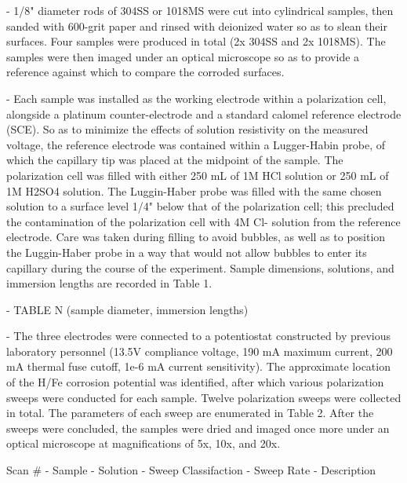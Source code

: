 - 1/8" diameter rods of 304SS or 1018MS were cut into cylindrical samples, then sanded with 600-grit paper and rinsed with deionized water so as to slean their surfaces.  Four samples were produced in total (2x 304SS and 2x 1018MS).  The samples were then imaged under an optical microscope so as to provide a reference against which to compare the corroded surfaces.

- Each sample was installed as the working electrode within a polarization cell, alongside a platinum counter-electrode and a standard calomel reference electrode (SCE).  So as to minimize the effects of solution resistivity on the measured voltage, the reference electrode was contained within a Lugger-Habin probe, of which the capillary tip was placed at the midpoint of the sample.  The polarization cell was filled with either 250 mL of 1M HCl solution or 250 mL of 1M H2SO4 solution.  The Luggin-Haber probe was filled with the same chosen solution to a surface level 1/4" below that of the polarization cell; this precluded the contamination of the polarization cell with 4M Cl- solution from the reference electrode.  Care was taken during filling to avoid bubbles, as well as to position the Luggin-Haber probe in a way that would not allow bubbles to enter its capillary during the course of the experiment.  Sample dimensions, solutions, and immersion lengths are recorded in Table 1.

- TABLE N (sample diameter, immersion lengths)

- The three electrodes were connected to a potentiostat constructed by previous laboratory personnel (13.5V compliance voltage, 190 mA maximum current, 200 mA thermal fuse cutoff, 1e-6 mA current sensitivity).  The approximate location of the H/Fe corrosion potential was identified, after which various polarization sweeps were conducted for each sample.  Twelve polarization sweeps were collected in total.  The parameters of each sweep are enumerated in Table 2.  After the sweeps were concluded, the samples were dried and imaged once more under an optical microscope at magnifications of 5x, 10x, and 20x.

Scan # - Sample - Solution - Sweep Classifaction - Sweep Rate - Description

